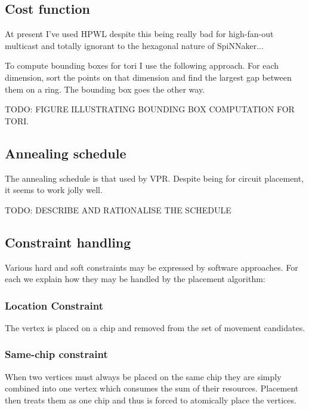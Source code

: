 		\subsection{Cost function}
			
			At present I've used HPWL despite this being really bad for high-fan-out
			multicast and totally ignorant to the hexagonal nature of SpiNNaker...
			
			To compute bounding boxes for tori I use the following approach. For each
			dimension, sort the points on that dimension and find the largest gap
			between them on a ring. The bounding box goes the other way.
			
			TODO: FIGURE ILLUSTRATING BOUNDING BOX COMPUTATION FOR TORI.
		
		\subsection{Annealing schedule}
			
			The annealing schedule is that used by VPR. Despite being for circuit
			placement, it seems to work jolly well.
			
			TODO: DESCRIBE AND RATIONALISE THE SCHEDULE
		
		\subsection{Constraint handling}
			
			Various hard and soft constraints may be expressed by software
			approaches. For each we explain how they may be handled by the placement
			algorithm:
			
			\subsubsection{Location Constraint}
				
				The vertex is placed on a chip and removed from the set of movement
				candidates.
			
			\subsubsection{Same-chip constraint}
				
				When two vertices must always be placed on the same chip they are
				simply combined into one vertex which consumes the sum of their
				resources. Placement then treats them as one chip and thus is forced to
				atomically place the vertices.
			
